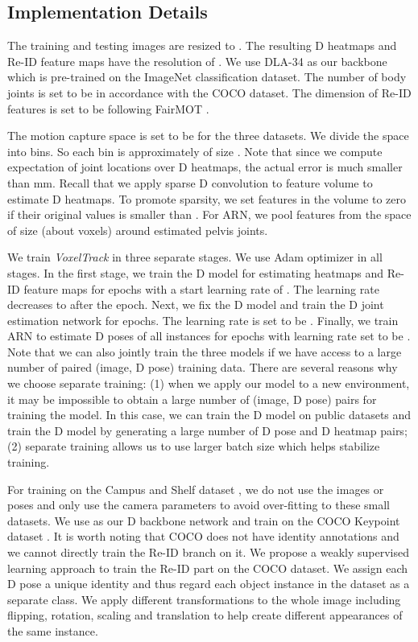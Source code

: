 \subsection{Implementation Details}
The training and testing images are resized to . The resulting D heatmaps and Re-ID feature maps have the resolution of . We use DLA-34 \cite{zhou2019objects} as our backbone which is pre-trained on the ImageNet classification dataset. The number of body joints  is set to be  in accordance with the COCO dataset. The dimension of Re-ID features is set to be  following FairMOT \cite{zhang2020simple}.

The motion capture space is set to be  for the three datasets. We divide the space into  bins. So each bin is approximately of size . Note that since we compute expectation of joint locations over D heatmaps, the actual error is much smaller than mm. Recall that we apply sparse D convolution to feature volume to estimate D heatmaps. To promote sparsity, we set features in the volume to zero if their original values is smaller than . For ARN, we pool features from the space of size  (about  voxels) around estimated pelvis joints. 


We train \emph{VoxelTrack} in three separate stages. We use Adam optimizer in all stages. In the first stage, we train the D model for estimating heatmaps and Re-ID feature maps for  epochs with a start learning rate of . The learning rate decreases to  after the  epoch. Next, we fix the D model and train the D joint estimation network for  epochs. The learning rate is set to be . Finally, we train ARN to estimate D poses of all instances for  epochs with learning rate set to be . Note that we can also jointly train the three models if we have access to a large number of paired (image, D pose) training data. There are several reasons why we choose separate training: (1) when we apply our model to a new environment, it may be impossible to obtain a large number of (image, D pose) pairs for training the model. In this case, we can train the D model on public datasets and train the D model by generating a large number of D pose and D heatmap pairs; (2) separate training allows us to use larger batch size which helps stabilize training. 

For training on the Campus and Shelf dataset \cite{belagiannis20143d}, we do not use the images or poses and only use the camera parameters to avoid over-fitting to these small datasets. We use \cite{cheng2020bottom} as our D backbone network and train on the COCO Keypoint dataset \cite{lin2014microsoft}. It is worth noting that COCO does not have identity annotations and we cannot directly train the Re-ID branch on it. We propose a weakly supervised learning approach to train the Re-ID part on the COCO dataset. We assign each D pose a unique identity and thus regard each object instance in the dataset as a separate class. We apply different transformations to the whole image including flipping, rotation, scaling and translation to help create different appearances of the same instance. 

